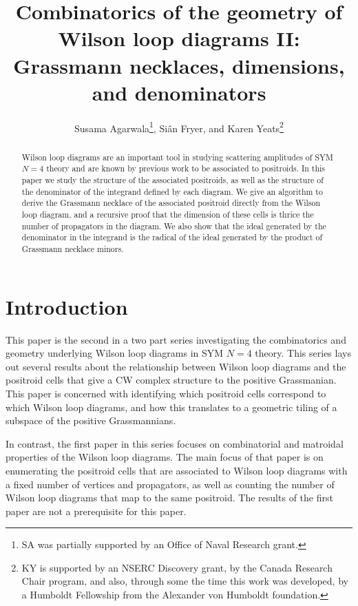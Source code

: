 \documentclass[11pt]{article}
\title{Combinatorics of the geometry of Wilson loop diagrams II: Grassmann necklaces, dimensions, and denominators}
\author{Susama Agarwala\thanks{SA was partially supported by an Office of Naval Research grant.}, Si\^an Fryer, and Karen Yeats\thanks{KY is supported by an NSERC Discovery grant, by the Canada Research Chair program, and also, through some the time this work was developed, by a Humboldt Fellowship from the Alexander von Humboldt foundation.}}
\date{}
\theoremstyle{remark}
\theoremstyle{definition}
\begin{document}
\maketitle

\begin{abstract}
  Wilson loop diagrams are an important tool in studying scattering amplitudes of SYM $N=4$ theory and are known by previous work to be associated to positroids. In this paper we study the structure of the associated positroids, as well as the structure of the denominator of the integrand defined by each diagram. We give an algorithm to derive the Grassmann necklace of the associated positroid directly from the Wilson loop diagram, and a recursive proof that the dimension of these cells is thrice the number of propagators in the diagram. We also show that the ideal generated by the denominator in the integrand is the radical of the ideal generated by the product of Grassmann necklace minors.
\end{abstract}
\section{Introduction}


This paper is the second in a two part series investigating the combinatorics and geometry underlying Wilson loop diagrams in SYM $N=4$ theory. This series lays out several results about the relationship between Wilson loop diagrams and the positroid cells that give a CW complex structure to the positive Grassmanian. This paper is concerned with identifying which positroid cells correspond to which Wilson loop diagrams, and how this translates to a geometric tiling of a subspace of the positive Grassmannians. 



In contrast, the first paper in this series focuses on combinatorial and matroidal properties of the Wilson loop diagrams. The main focus of that paper is on enumerating the positroid cells that are associated to Wilson loop diagrams with a fixed number of vertices and propagators, as well as counting the number of Wilson loop diagrams that map to the same positroid. The results of the first paper are not a prerequisite for this paper.
\end{document}
